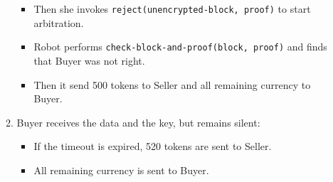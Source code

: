 \begin{itemize}
\begin{enumerate}
\begin{itemize}
        \item Then she invokes \verb|reject(unencrypted-block, proof)| to start arbitration.

        \item Robot performs \verb|check-block-and-proof(block, proof)| and finds that Buyer was not right.

        \item Then it send 500 tokens to Seller and all remaining currency to Buyer.
      \end{itemize}
    \item Buyer receives the data and the key, but remains silent:
      \begin{itemize}
        \item If the timeout is expired, 520 tokens are sent to Seller.
        \item All remaining currency is sent to Buyer.
      \end{itemize}
  \end{enumerate}

\end{itemize}
